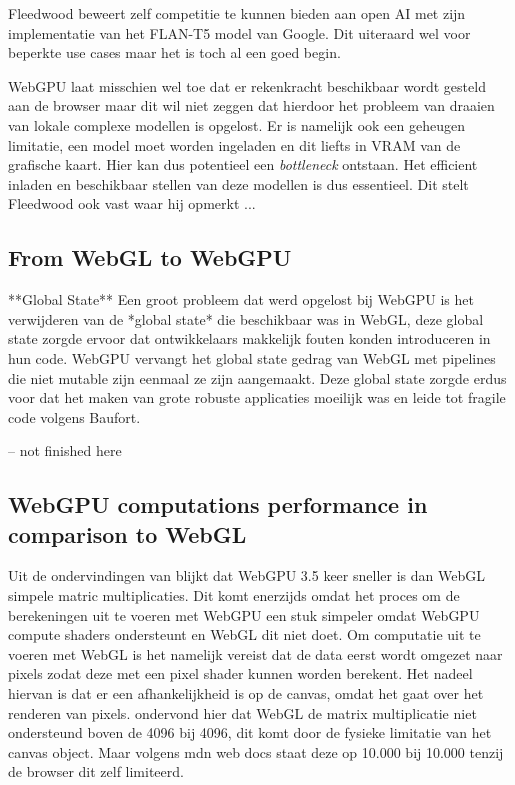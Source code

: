 \bigbreak{}

Fleedwood beweert zelf competitie te kunnen bieden aan open AI met zijn implementatie van het FLAN-T5 model van Google. Dit uiteraard wel voor beperkte use cases maar het is toch al een goed begin.

\bigbreak{}

WebGPU laat misschien wel toe dat er rekenkracht beschikbaar wordt gesteld aan de browser maar dit wil niet zeggen dat hierdoor het probleem van draaien van lokale complexe modellen is opgelost. Er is namelijk ook een geheugen limitatie, een model moet worden ingeladen en dit liefts in VRAM van de grafische kaart. Hier kan dus potentieel een \textit{bottleneck} ontstaan. Het efficient inladen en beschikbaar stellen van deze modellen is dus essentieel. Dit stelt Fleedwood ook vast waar hij opmerkt ... 

\subsection{From WebGL to WebGPU}

**Global State**
Een groot probleem dat werd opgelost bij WebGPU is het verwijderen van de *global state* die beschikbaar was in WebGL, deze global state zorgde ervoor dat ontwikkelaars makkelijk fouten konden introduceren in hun code. WebGPU vervangt het global state gedrag van WebGL met pipelines die niet mutable zijn eenmaal ze zijn aangemaakt.
Deze global state zorgde erdus voor dat het maken van grote robuste applicaties moeilijk was en leide tot fragile code volgens Baufort.

-- not finished here


\subsection{WebGPU computations performance in comparison to WebGL} %

Uit de ondervindingen van \textcite{Radin2021} blijkt dat WebGPU 3.5 keer sneller is dan WebGL simpele matric multiplicaties. Dit komt enerzijds omdat het proces om de berekeningen uit te voeren met WebGPU een stuk simpeler omdat WebGPU compute shaders ondersteunt en WebGL dit niet doet. Om computatie uit te voeren met WebGL is het namelijk vereist dat de data eerst wordt omgezet naar pixels zodat deze met een pixel shader kunnen worden berekent. Het nadeel hiervan is dat er een afhankelijkheid is op de canvas, omdat het gaat over het renderen van pixels. \textcite{Radin2021} ondervond hier dat WebGL de matrix multiplicatie niet ondersteund boven de 4096 bij 4096, dit komt door de fysieke limitatie van het canvas object. Maar volgens mdn web docs staat deze op 10.000 bij 10.000 tenzij de browser dit zelf limiteerd.


